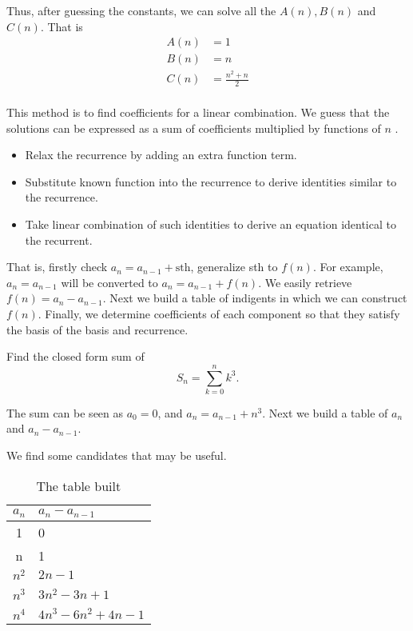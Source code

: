 Thus, after guessing the constants, we can solve all the $A(n), B (n) $ 
and $C(n)$. That is 
\begin{align*}
    A(n) &= 1 \\
    B(n) &= n \\
    C(n) &= \frac{n^2 +n}{2}\\
\end{align*}





 This method is to find coefficients for a linear 
combination. We guess that the solutions can be expressed 
as a sum of coefficients multiplied by functions of $n$ . 

\begin{itemize}
    \item Relax the recurrence by adding an extra function term.
    \item Substitute known function into the recurrence to derive 
        identities similar to the recurrence. 
    \item Take linear combination of such identities to derive an equation
        identical to the recurrent. 
\end{itemize}

That is, firstly check $a_n =a_{n-1}+\text{sth}$, generalize sth to $f(n)$.
For example, $a_n = a_{n-1}$ will be converted to $a_n=a_{n-1}+f(n)$.
We easily retrieve $f(n)=a_n-a_{n-1}.$ Next we build a table of indigents
in which we can construct $f(n)$. Finally, we determine coefficients of 
each component so that they satisfy the basis of the basis and 
recurrence. 

 Find the closed form sum of 
\[
   S_n = \sum_{k=0}^{n}k^3.  
\]

The sum can be seen as $a_0=0$, and $a_n = a_{n-1}+n^3$. Next we build 
a table of $a_n$ and $a_n - a_{n-1 }$. 

We find some candidates that may be useful.

\begin{table}[htpb]
    \centering
    \caption{The table built}
    \label{tab:rep-fig}

    \begin{tabular}{c|l}
        $a_n$ & $a_n-a_{n-1}$ \\
        \hline 
        1 & 0\\
        n & 1\\
        $n^2$ & $2n-1$\\
        $n^3$ & 3$n^2-3n+1$\\
        $n^4$ & $4n^3-6n^2+4n-1$
    \end{tabular}
\end{table}

